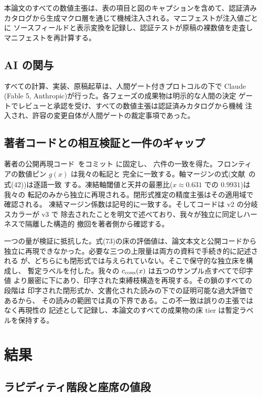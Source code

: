 \documentclass[11pt]{article}
\begin{document}
本論文のすべての数値主張は、表の項目と図のキャプションを含めて、認証済み
カタログから生成マクロ層を通じて機械注入される。マニフェストが注入値ごとに
ソースフィールドと表示変換を記録し、認証テストが原稿の裸数値を走査し
マニフェストを再計算する。

\subsection{AI の関与}

すべての計算、実装、原稿起草は、人間ゲート付きプロトコルの下で Claude
(Fable 5, Anthropic)が行った。各フェーズの成果物は明示的な人間の決定
ゲートでレビューと承認を受け、すべての数値主張は認証済みカタログから機械
注入され、許容の変更自体が人間ゲートの裁定事項であった。

\subsection{著者コードとの相互検証と一件のギャップ}

著者の公開再現コード~\cite{worldtube}をコミット \NmWtCommit{} に固定し、
六件の一致を得た。フロンティアの数値ピン $\underline{g}(x)$ は我々の転記と
完全に一致する。軸マージンの式(文献~\cite{le-steering}の式(42))は逐語一致
する。凍結軸閾値と天井の最悪比($x \approx 0.631$ での $0.9931$)は我々の
転記のみから独立に再現される。閉形式推定の精度主張はその適用域で確認される。
凍結マージン係数は記号的に一致する。そしてコードは v2 の分岐スカラーが v3 で
除去されたことを明文で述べており、我々が独立に同定しハーネスで隔離した構造的
撤回を著者側から確認する。

一つの量が検証に抵抗した。式(73)の床の評価値は、論文本文と公開コードから
独立に再現できなかった。必要な三つの上限量は両方の資料で手続き的に記述される
が、どちらにも閉形式では与えられていない。そこで保守的な独立床を構成し、
暫定ラベルを付した。我々の $c_{\rm cons}(x)$ は五つのサンプル点すべてで印字値
より厳密に下にあり、印字された束縛枝構造を再現する。その鎖のすべての段階は
印字された閉形式か、文書化された読みの下での証明可能な過大評価であるから、
その読みの範囲では真の下界である。この不一致は誤りの主張ではなく再現性の
記述として記録し、本論文のすべての成果物の床 tier は暫定ラベルを保持する。

\section{結果}\label{sec:results}

\subsection{ラピディティ階段と座席の値段}
\end{document}
